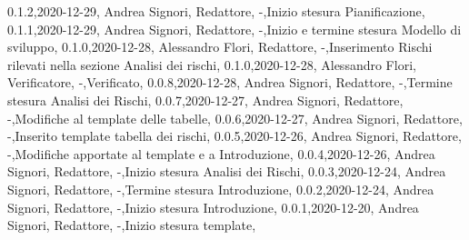 {    {0.1.2,2020-12-29, Andrea Signori, Redattore, -,Inizio stesura Pianificazione},
    {0.1.1,2020-12-29, Andrea Signori, Redattore, -,Inizio e termine stesura Modello di sviluppo},
    {0.1.0,2020-12-28, Alessandro Flori, Redattore, -,Inserimento Rischi rilevati nella sezione Analisi dei rischi},
    {0.1.0,2020-12-28, Alessandro Flori, Verificatore, -,Verificato},
    {0.0.8,2020-12-28, Andrea Signori, Redattore, -,Termine stesura Analisi dei Rischi},
    {0.0.7,2020-12-27, Andrea Signori, Redattore, -,Modifiche al template delle tabelle},
    {0.0.6,2020-12-27, Andrea Signori, Redattore, -,Inserito template tabella dei rischi},
    {0.0.5,2020-12-26, Andrea Signori, Redattore, -,Modifiche apportate al template e a Introduzione},
    {0.0.4,2020-12-26, Andrea Signori, Redattore, -,Inizio stesura Analisi dei Rischi},
    {0.0.3,2020-12-24, Andrea Signori, Redattore, -,Termine stesura Introduzione},
    {0.0.2,2020-12-24, Andrea Signori, Redattore, -,Inizio stesura Introduzione},
    {0.0.1,2020-12-20, Andrea Signori, Redattore, -,Inizio stesura template},
}
